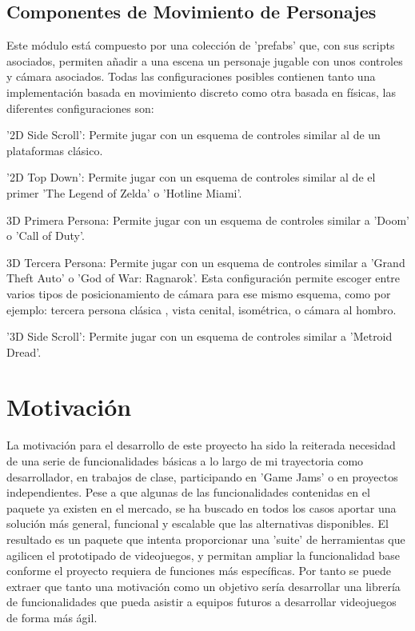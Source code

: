 \subsection{Componentes de Movimiento de Personajes}
Este módulo está compuesto por una colección de 'prefabs' que, con sus scripts asociados, permiten añadir a una escena un personaje jugable con unos controles y cámara asociados.
Todas las configuraciones posibles contienen tanto una implementación basada en movimiento discreto como otra basada en físicas, las diferentes configuraciones son: 
\begin{compactitem}
  \item '2D Side Scroll': Permite jugar con un esquema de controles similar al de un plataformas clásico.
  \item '2D Top Down': Permite jugar con un esquema de controles similar al de el primer 'The Legend of Zelda' o 'Hotline Miami'.
  \item 3D Primera Persona: Permite jugar con un esquema de controles similar a 'Doom' o 'Call of Duty'.
  \item 3D Tercera Persona: Permite jugar con un esquema de controles similar a 'Grand Theft Auto' o 'God of War: Ragnarok'. Esta configuración permite escoger entre varios 
   tipos de posicionamiento de cámara para ese mismo esquema, como por ejemplo: tercera persona clásica , vista cenital, isométrica, o cámara al hombro. 
  \item '3D Side Scroll': Permite jugar con un esquema de controles similar a 'Metroid Dread'.
\end{compactitem}

\section{Motivación}

La motivación para el desarrollo de este proyecto ha sido la reiterada necesidad de una serie de funcionalidades básicas a lo largo de mi trayectoria como desarrollador,
 en trabajos de clase, participando en 'Game Jams' o en proyectos independientes. Pese a que algunas de las funcionalidades contenidas en el paquete ya existen en el mercado,
 se ha buscado en todos los casos aportar una solución más general, funcional y escalable que las alternativas disponibles. El resultado es un paquete que intenta proporcionar
 una 'suite' de herramientas que agilicen el prototipado de videojuegos, y permitan ampliar la funcionalidad base conforme el proyecto requiera de funciones más específicas. 
 Por tanto se puede extraer que tanto una motivación como un objetivo sería desarrollar una librería de funcionalidades que pueda asistir a equipos futuros a desarrollar
 videojuegos de forma más ágil.

